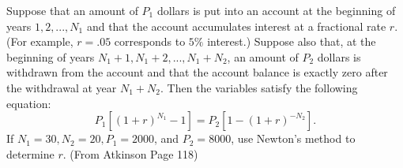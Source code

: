 \begin{problem}
Suppose that an amount of $P_1$ dollars is put into an account at the beginning of years $1, 2,..., N_1$ and that the account accumulates interest at a fractional rate $r$.
(For example, $r = .05$ corresponds to $5\%$ interest.)
Suppose also that, at the beginning of years $N_1 + 1, N_1 + 2, ..., N_1 + N_2$, an amount of $P_2$ dollars is withdrawn from the account and that the account balance is exactly zero after the withdrawal at year $N_1 + N_2$.
Then the variables satisfy the following equation:
\[
P_1[(1+r)^{N_1} - 1] = P_2[1-(1+r)^{-N_2}].
\]
If $N_1 =30, N_2 =20, P_1 =2000$, and $P_2 =8000$, use Newton's method to
determine $r$.
(From Atkinson Page 118)
\end{problem}

